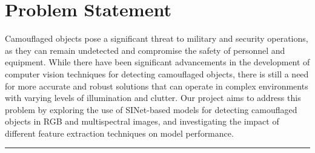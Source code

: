 \section{{{\fontsize{17}{21}\selectfont \textbf{Problem Statement}}}}
\setlength{\columnsep}{1.5cm}

\begin{multicols}{2}

Camouflaged objects pose a significant threat to military and security operations, as they can remain undetected and compromise the safety of personnel and equipment. While there have been significant advancements in the development of computer vision techniques for detecting camouflaged objects, there is still a need for more accurate and robust solutions that can operate in complex environments with varying levels of illumination and clutter. Our project aims to address this problem by exploring the use of SINet-based models for detecting camouflaged objects in RGB and multispectral images, and investigating the impact of different feature extraction techniques on model performance.
\end{multicols}

\vspace{0.5cm}
{\color{gray}\hrule}
\vspace{0.5cm}